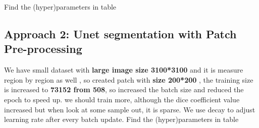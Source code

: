 \documentclass{article}
\begin{document}
Find the (hyper)parameters in table 
\begin{table}[tbh]
\caption{Approach 1 : RESULTS / OBSERVATION} 
\end{table}

\subsection{Approach 2: Unet segmentation with Patch Pre-processing}
We have small dataset with\textbf{ large image size 3100*3100} and it is measure region by region as well , so created patch with \textbf{size 200*200} , the training size is increased to \textbf{73152 from 508}, so increased the batch size and reduced the epoch to speed up. we should train more, although the dice coefficient value increased but when look at some sample out, it is sparse.  We use decay to adjust learning rate after every batch update. 
Find the (hyper)parameters in table 

\begin{table}[tbh]
\caption{Approach 2 : RESULTS / OBSERVATION} 
\end{table}
\end{document}
